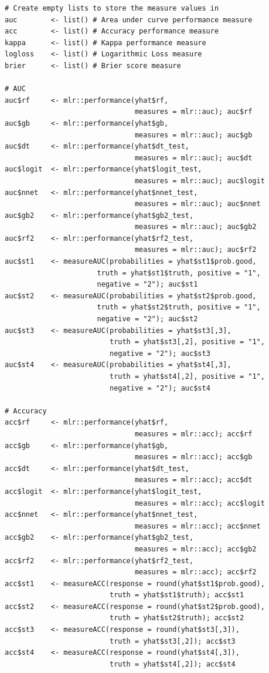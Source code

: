 \documentclass[12pt]{article}
\begin{document}
\begin{lstlisting}
# Create empty lists to store the measure values in
auc        <- list() # Area under curve performance measure
acc        <- list() # Accuracy performance measure
kappa      <- list() # Kappa performance measure
logloss    <- list() # Logarithmic Loss measure
brier      <- list() # Brier score measure 

# AUC
auc$rf     <- mlr::performance(yhat$rf, 
                               measures = mlr::auc); auc$rf
auc$gb     <- mlr::performance(yhat$gb, 
                               measures = mlr::auc); auc$gb
auc$dt     <- mlr::performance(yhat$dt_test, 
                               measures = mlr::auc); auc$dt
auc$logit  <- mlr::performance(yhat$logit_test, 
                               measures = mlr::auc); auc$logit
auc$nnet   <- mlr::performance(yhat$nnet_test, 
                               measures = mlr::auc); auc$nnet
auc$gb2    <- mlr::performance(yhat$gb2_test, 
                               measures = mlr::auc); auc$gb2
auc$rf2    <- mlr::performance(yhat$rf2_test, 
                               measures = mlr::auc); auc$rf2
auc$st1    <- measureAUC(probabilities = yhat$st1$prob.good, 
                      truth = yhat$st1$truth, positive = "1", 
                      negative = "2"); auc$st1
auc$st2    <- measureAUC(probabilities = yhat$st2$prob.good, 
                      truth = yhat$st2$truth, positive = "1", 
                      negative = "2"); auc$st2
auc$st3    <- measureAUC(probabilities = yhat$st3[,3], 
                         truth = yhat$st3[,2], positive = "1", 
                         negative = "2"); auc$st3
auc$st4    <- measureAUC(probabilities = yhat$st4[,3], 
                         truth = yhat$st4[,2], positive = "1", 
                         negative = "2"); auc$st4

# Accuracy
acc$rf     <- mlr::performance(yhat$rf, 
                               measures = mlr::acc); acc$rf
acc$gb     <- mlr::performance(yhat$gb, 
                               measures = mlr::acc); acc$gb
acc$dt     <- mlr::performance(yhat$dt_test, 
                               measures = mlr::acc); acc$dt
acc$logit  <- mlr::performance(yhat$logit_test, 
                               measures = mlr::acc); acc$logit
acc$nnet   <- mlr::performance(yhat$nnet_test,
                               measures = mlr::acc); acc$nnet
acc$gb2    <- mlr::performance(yhat$gb2_test,
                               measures = mlr::acc); acc$gb2
acc$rf2    <- mlr::performance(yhat$rf2_test, 
                               measures = mlr::acc); acc$rf2
acc$st1    <- measureACC(response = round(yhat$st1$prob.good), 
                         truth = yhat$st1$truth); acc$st1
acc$st2    <- measureACC(response = round(yhat$st2$prob.good), 
                         truth = yhat$st2$truth); acc$st2
acc$st3    <- measureACC(response = round(yhat$st3[,3]), 
                         truth = yhat$st3[,2]); acc$st3
acc$st4    <- measureACC(response = round(yhat$st4[,3]), 
                         truth = yhat$st4[,2]); acc$st4


\end{lstlisting}
\end{document}
